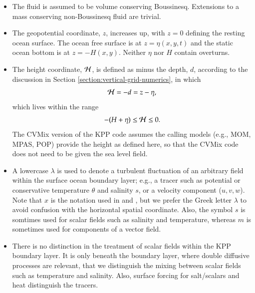 \begin{itemize}
 
\item The fluid is assumed to be volume conserving Boussinesq.
  Extensions to a mass conserving non-Boussinesq fluid are trivial.

\item \label{geopotential_defined} The geopotential coordinate, $z$,
  increases up, with $z=0$ defining the resting ocean surface. The
  ocean free surface is at $z=\eta(x,y,t)$ and the static ocean bottom
  is at $z=-H(x,y)$.  Neither $\eta$ nor $H$ contain overturns.

\item \label{height_defined} The height coordinate, ${\cal H}$, is
  defined as minus the depth, $d$, according to the discussion in
  Section \ref{section:vertical-grid-numerics}, in which
\begin{equation}
  {\cal  H} = -d = z - \eta,
\label{eq:height-defined-kpp}
\end{equation} 
which lives within the range 
\begin{equation}
 -(H+\eta) \le  {\cal  H} \le 0.
\label{eq:height-range-defined-kpp}
\end{equation} 
The CVMix version of the KPP code assumes the calling models (e.g.,
MOM, MPAS, POP) provide the height as defined here, so that the CVMix
code does not need to be given the sea level field.

\item \label{lambda_defined} A lowercase $\lambda$ is used to denote a
  turbulent fluctuation of an arbitrary field within the surface ocean
  boundary layer; e.g., a tracer such as potential or conservative
  temperature $\theta$ and salinity $s$, or a velocity component
  ($u,v,w$). Note that $x$ is the notation used in \cite{LargeKPP} and
  \cite{LargeKPP_lectures}, but we prefer the Greek letter $\lambda$
  to avoid confusion with the horizontal spatial coordinate.  Also,
  the symbol $s$ is somtimes used for scalar fields such as salinity
  and temperature, whereas $m$ is sometimes used for components of a
  vector field.

\item There is no distinction in the treatment of scalar fields within
  the KPP boundary layer.  It is only beneath the boundary layer,
  where double diffusive processes are relevant, that we distinguish
  the mixing between scalar fields such as temperature and salinity.
  Also, surface forcing for salt/scalars and heat distinguish the
  tracers.


\end{itemize}
